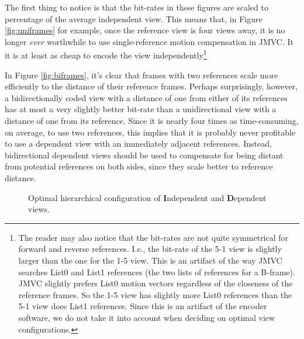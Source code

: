 \documentclass{sig-alternate-05-2015}
\begin{document}
The first thing to notice is that the bit-rates in these figures are scaled to
percentage of the average independent view. This means that, in Figure
\ref{fig:uniframes} for example, once the reference view is four views away,
it is no longer {\it ever} worthwhile to use single-reference motion
compensation in JMVC. It it is at least as cheap to encode the view
independently\footnote{The reader may also notice that the bit-rates are not
quite symmetrical for forward and reverse references. I.e., the bit-rate of
the 5-1 view is slightly larger than the one for the 1-5 view. This is an
artifact of the way JMVC searches List0 and List1 references (the two lists
of references for a B-frame). JMVC slightly prefers List0 motion vectors
regardless of the closeness of the reference frames. So the 1-5 view has
slightly more List0 references than the 5-1 view does List1 references. Since
this is an artifact of the encoder software, we do not take it into account when
deciding on optimal view configurations.}

In Figure \ref{fig:biframes}, it's clear that frames with two references scale
more efficiently to the distance of their reference frames. Perhaps
surprisingly, however, a bidirectionally coded view with a distance of one from
either of its references has at most a very slightly better bit-rate than a
unidirectional view with a distance of one from its reference. Since it is
nearly four times as time-consuming, on average, to use two references, this
implies that it is probably never profitable to use a dependent view with an
immediately adjacent references. Instead, bidirectional dependent views should
be used to compensate for being distant from potential references on both sides,
since they scale better to reference distance.

\begin{figure}[H]
\begin{center}
\end{center}
\caption{
Optimal hierarchical configuration of \textbf{I}ndependent and
\textbf{D}ependent views.
}
\label{fig:hierarchical}
\end{figure}
\end{document}
